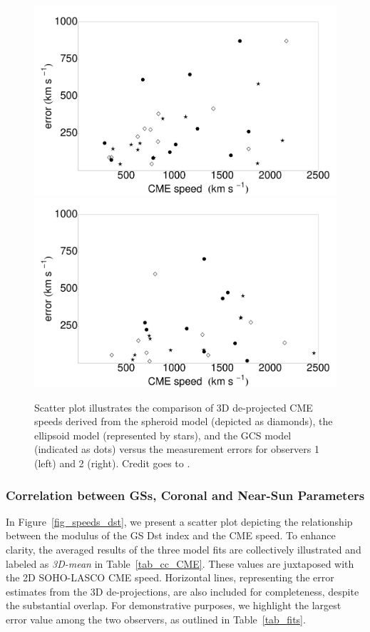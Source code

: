 \begin{figure}[!htp]
	\centering
	\includegraphics[width=0.48\hsize]{chapter2/figs/Fig_er_speed1.pdf}
	\includegraphics[width=0.48\hsize]{chapter2/figs/Fig_er_speed2.pdf}
	\caption{Scatter plot illustrates the comparison of 3D de-projected CME speeds derived from the spheroid model (depicted as diamonds), the ellipsoid model (represented by stars), and the GCS model (indicated as dots) versus the measurement errors for observers 1 (left) and 2 (right). Credit goes to \citet{miteva_2023}.}
	\label{fig_vcme_err}
\end{figure}

\subsubsection{Correlation between GSs, Coronal and Near-Sun Parameters}
In Figure~\ref{fig_speeds_dst}, we present a scatter plot depicting the relationship between the modulus of the GS Dst index and the CME speed. To enhance clarity, the averaged results of the three model fits are collectively illustrated and labeled as \textit{3D-mean} in Table~\ref{tab_cc_CME}. These values are juxtaposed with the 2D SOHO-LASCO CME speed. Horizontal lines, representing the error estimates from the 3D de-projections, are also included for completeness, despite the substantial overlap. For demonstrative purposes, we highlight the largest error value among the two observers, as outlined in Table~\ref{tab_fits}.

